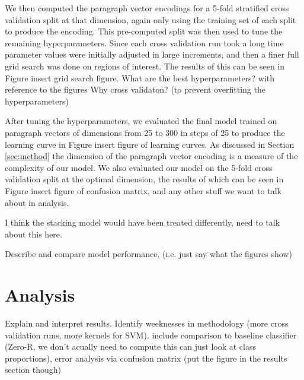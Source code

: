 \documentclass[11pt]{article}
\newcommand{\drafting}[1]{\textcolor{OliveGreen}{#1}}
\begin{document}
We then computed the paragraph vector encodings for a 5-fold stratified cross validation split at that dimension, again only using the training set of each split to produce the encoding. This pre-computed split was then used to tune the remaining hyperparameters. Since each cross validation run \drafting{took a long time} parameter values were initially adjusted in large increments, and then a finer full grid search was done on regions of interest. The results of this can be seen in Figure \drafting{insert grid search figure}.  \drafting{What are the best hyperparameters? with reference to the figures} \drafting{Why cross validaton? (to prevent overfitting the hyperparameters)} 

After tuning the hyperparameters, we evaluated the final model trained on paragraph vectors of dimensions from 25 to 300 in steps of 25 to produce the learning curve in Figure \drafting{insert figure of learning curves}. As discussed in Section \ref{sec:method} the dimension of the paragraph vector encoding is a measure of the complexity of our model. We also evaluated our model on the 5-fold cross validation split at the optimal dimension, the results of which can be seen in Figure \drafting{insert figure of confusion matrix, and any other stuff we want to talk about in analysis}.

\drafting{I think the stacking model would have been treated differently, need to talk about this here.}

\drafting{
Describe and compare model performance. (i.e. just say what the figures show)
}



\section{Analysis}
\drafting{
Explain and interpret results. Identify weeknesses in methodology (more cross validation runs, more kernels for SVM).
include comparison to baseline classifier (Zero-R, we don't acually need to compute this can just look at class proportions), error analysis via confusion matrix (put the figure in the results section though)
}
\end{document}
